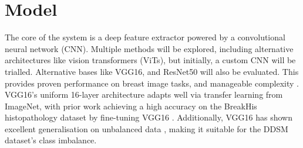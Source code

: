 \documentclass[../main]{subfiles}
\begin{document}
\section{Model}
The core of the system is a deep feature extractor powered by a convolutional neural network (CNN). Multiple methods will be explored, including alternative architectures like vision transformers (ViTs), but initially, a custom CNN will be trialled. Alternative bases like VGG16, and ResNet50 will also be evaluated. This provides proven performance on breast image tasks, and manageable complexity \autocite{fatima2025application}. VGG16's uniform 16-layer architecture adapts well via transfer learning from ImageNet, with prior work achieving a high accuracy on the BreakHis histopathology dataset by fine-tuning VGG16 \autocite{fatima2025application}. Additionally, VGG16 has shown excellent generalisation on unbalanced data \autocite{fatima2025application}, making it suitable for the DDSM dataset's class imbalance.
\end{document}
